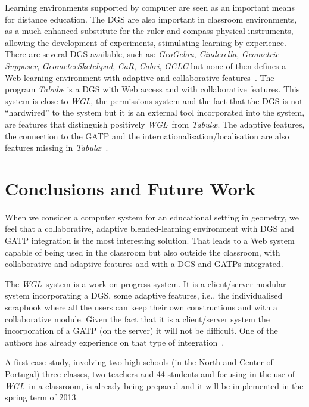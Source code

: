 \documentclass{llncs}
\newcommand{\WGL}{{\em WGL}}
\begin{document}
Learning environments supported by computer are seen as an important
means for distance education.  The DGS are also important in classroom
environments, as a much enhanced substitute for the ruler and compass
physical instruments, allowing the development of experiments,
stimulating learning by experience. There are several DGS available,
such as: {\em GeoGebra}, {\em Cinderella}, {\em Geometric Supposer},
{\em GeometerSketchpad}, {\em CaR}, {\em Cabri}, {\em GCLC} but none
of then defines a Web learning environment with adaptive and
collaborative features~\cite{Santos2013}.  The program {\em
  Tabul{\ae}} is a DGS with Web access and with collaborative
features. This system is close to \WGL, the permissions system and
the fact that the DGS is not ``hardwired'' to the system but it is an
external tool incorporated into the system, are features that
distinguish positively \WGL\ from {\em Tabul{\ae}}. The adaptive
features, the connection to the GATP and the
internationalisation/localisation are also features missing in {\em
  Tabul{\ae}}~\cite{Santos2013}.

\section{Conclusions and Future Work}
\label{sec:ConclusionsFutureWork}

When we consider a computer system for an educational setting in
geometry, we feel that a collaborative, adaptive blended-learning
environment with DGS and GATP integration is the most interesting
solution. That leads to a Web system capable of being used in the
classroom but also outside the classroom, with collaborative and
adaptive features and with a DGS and GATPs integrated.

The \WGL\ system is a work-on-progress system. It is a client/server
modular system incorporating a DGS, some adaptive features, i.e., the
individualised scrapbook where all the users can keep their own
constructions and with a collaborative module. Given the fact that it
is a client/server system the incorporation of a GATP (on the server)
it will not be difficult. One of the authors has already experience on
that type of integration~\cite{Janicic2007,Quaresma2011,Quaresma06d}.

A first case study, involving two high-schools (in the North and
Center of Portugal) three classes, two teachers and 44 students and
focusing in the use of \WGL\ in a classroom, is already being prepared
and it will be implemented in the spring term of 2013.
\end{document}
